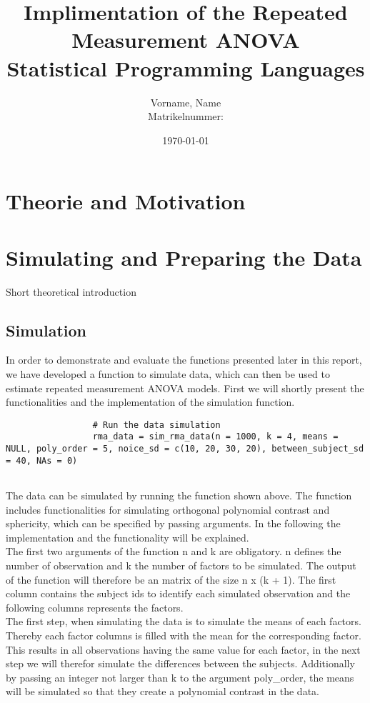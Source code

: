 \documentclass[11pt]{article}
\author{Vorname, Name\\Matrikelnummer: }
\title{\textbf{Implimentation of the Repeated Measurement ANOVA}\\ Statistical Programming Languages \\[5cm]}
\date{\today}
\begin{document}
	\maketitle
	\thispagestyle{fancy}
	\newpage
	\tableofcontents
	\newpage
	\section{Theorie and Motivation}
	\section{Simulating and Preparing the Data}
	Short theoretical introduction
		\subsection{Simulation}
				 In order to demonstrate and evaluate the functions presented later in this report, we have developed a function to simulate data, which can then be used to estimate repeated measurement ANOVA models. First we will shortly present the functionalities and the implementation of the simulation function.\\
				 
				 \begin{lstlisting}
				 # Run the data simulation
				 rma_data = sim_rma_data(n = 1000, k = 4, means = NULL, poly_order = 5, noice_sd = c(10, 20, 30, 20), between_subject_sd = 40, NAs = 0)
				 
				 \end{lstlisting}
				 
				 The data can be simulated by running the function shown above. The function includes functionalities for simulating orthogonal polynomial contrast and sphericity, which can be specified by passing arguments. In the following the implementation and the functionality will be explained.\\
				 
				 The first two arguments of the function n and k are obligatory. n defines the number of observation and k the number of factors to be simulated. The output of the function will therefore be an matrix of the size n x (k + 1). The first column contains the subject ids to identify each simulated observation and the following columns represents the factors.\\
				 
				 The first step, when simulating the data is to simulate the means of each factors. Thereby each factor columns is filled with the mean for the corresponding factor. This results in all observations having the same value for each factor, in the next step we will therefor simulate the differences between the subjects.  Additionally by passing an integer not larger than k to the argument poly\_order, the means will be simulated so that they create a polynomial contrast in the data.\\
				 
\end{document}
